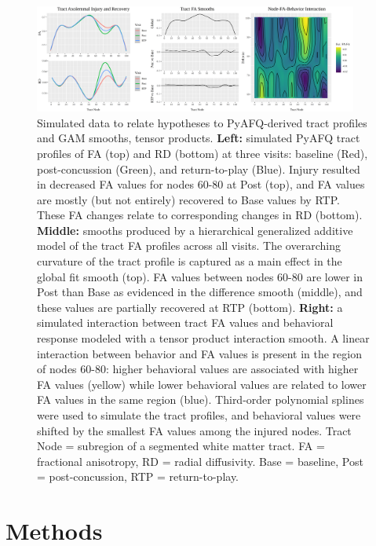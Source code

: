 \documentclass[12pt]{article}
\begin{document}
\begin{figure}[H]
	\centering
	\includegraphics[width=0.95\textwidth]{fig_hypotheses.png}
	\caption{Simulated data to relate hypotheses to PyAFQ-derived tract profiles and GAM smooths, tensor products. \textbf{Left:} simulated PyAFQ tract profiles of FA (top) and RD (bottom) at three visits: baseline (Red), post-concussion (Green), and return-to-play (Blue). Injury resulted in decreased FA values for nodes 60-80 at Post (top), and FA values are mostly (but not entirely) recovered to Base values by RTP. These FA changes relate to corresponding changes in RD (bottom). \textbf{Middle:} smooths produced by a hierarchical generalized additive model of the tract FA profiles across all visits. The overarching curvature of the tract profile is captured as a main effect in the global fit smooth (top). FA values between nodes 60-80 are lower in Post than Base as evidenced in the difference smooth (middle), and these values are partially recovered at RTP (bottom). \textbf{Right:} a simulated interaction between tract FA values and behavioral response modeled with a tensor product interaction smooth. A linear interaction between behavior and FA values is present in the region of nodes 60-80: higher behavioral values are associated with higher FA values (yellow) while lower behavioral values are related to lower FA values in the same region (blue). Third-order polynomial splines were used to simulate the tract profiles, and behavioral values were shifted by the smallest FA values among the injured nodes. Tract Node = subregion of a segmented white matter tract. FA = fractional anisotropy, RD = radial diffusivity. Base = baseline, Post = post-concussion, RTP = return-to-play.}
	\label{fig:intro-hyp}
\end{figure}


\section{Methods}
\label{sec:meth}
\end{document}

